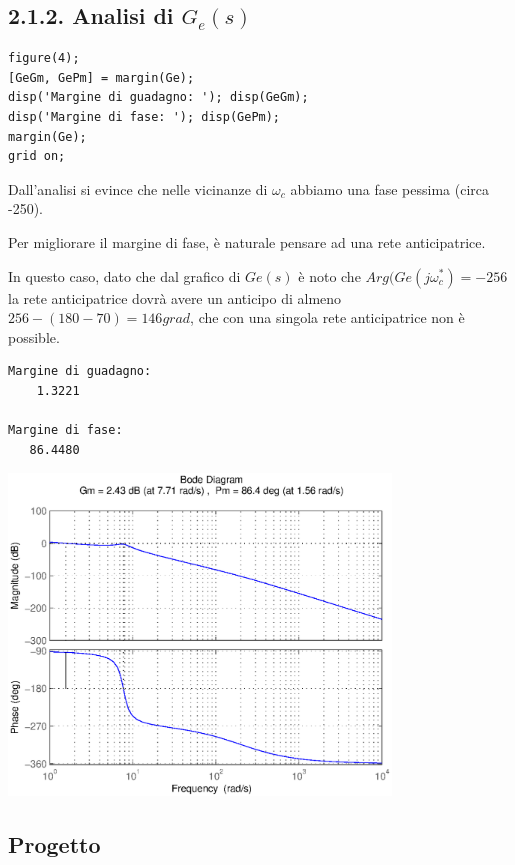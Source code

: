 \documentclass{article}
\begin{document}
\subsection*{2.1.2. Analisi di $ G_e(s) $ }

\begin{verbatim}
figure(4);
[GeGm, GePm] = margin(Ge);
disp('Margine di guadagno: '); disp(GeGm);
disp('Margine di fase: '); disp(GePm);
margin(Ge);
grid on;
\end{verbatim}
\begin{par}

Dall'analisi si evince che nelle vicinanze di $ \omega_c $ abbiamo una fase pessima (circa -250).

Per migliorare il margine di fase, è naturale pensare ad una rete anticipatrice.

In questo caso, dato che dal grafico di $ Ge(s) $ è noto che $ Arg(Ge(j\omega_{c}^*) = -256 $ 
la rete anticipatrice dovrà avere un anticipo di almeno $ 256 - ( 180 - 70) =  146 grad $, che con una singola rete anticipatrice non è possible.
\end{par}

        \color{lightgray} \begin{verbatim}Margine di guadagno: 
    1.3221

Margine di fase: 
   86.4480

\end{verbatim} \color{black}
    
\includegraphics [width=4in]{prog6RADICI_04.eps}


\subsection*{Progetto}
\end{document}

